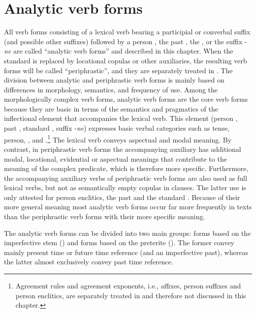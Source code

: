 \chapter{Analytic verb forms}
\label{cpt:Analytic verb forms}

All verb forms consisting of a lexical verb bearing a participial or converbal suffix (and possible other suffixes) followed by a person , the past , the  , or the suffix -\textit{ne} are called ``analytic verb forms'' and described in this chapter. When the standard  is replaced by locational copulas or other auxiliaries, the resulting verb forms will be called ``periphrastic'', and they are separately treated in . The division between analytic and periphrastic verb forms is mainly based on differences in morphology, semantics, and frequency of use. Among the morphologically complex verb forms, analytic verb forms are the core verb forms because they are basic in terms of the semantics and pragmatics of the inflectional element that accompanies the lexical verb. This element (person , past , standard , suffix -\textit{ne}) expresses basic verbal categories such as tense, person, , and .\footnote{Agreement rules and agreement exponents, i.e.,  affixes, person suffixes and person enclitics, are separately treated in  and therefore not discussed in this chapter.} The lexical verb conveys aspectual and modal meaning. By contrast, in periphrastic verb forms the accompanying auxiliary has additional modal, locational, evidential or aspectual meanings that contribute to the meaning of the complex predicate, which is therefore more specific. Furthermore, the accompanying auxiliary verbs of periphrastic verb forms are also used as full lexical verbs, but not as semantically empty copulas in  clauses. The latter use is only attested for person enclitics, the past  and the standard . Because of their more general meaning most analytic verb forms occur far more frequently in texts than the periphrastic verb forms with their more specific meaning.     

The analytic verb forms can be divided into two main groups: forms based on the imperfective stem () and forms based on the preterite (). The former convey mainly present time or future time reference (and an imperfective past), whereas the latter almost exclusively convey past time reference.



